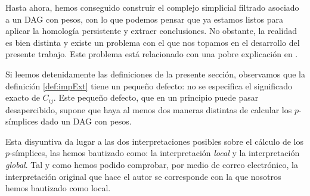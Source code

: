 \documentclass[12pt, a4paper, twoside]{book}
\numberwithin{equation}{section}
\theoremstyle{definition}
\theoremstyle{remark}
\theoremstyle{plain}
\begin{document}
	Hasta ahora, hemos conseguido construir el complejo simplicial 
	filtrado asociado a un DAG con pesos, con lo que podemos pensar que ya 
	estamos listos para aplicar la homología persistente y extraer 
	conclusiones. No obstante, la realidad es bien distinta y existe un 
	problema con el que nos topamos en el desarrollo del presente trabajo. 
	Este problema está relacionado con una pobre explicación en 
	\cite{Articulo-Watanabe}. 
	
	Si leemos detenidamente las definiciones de la presente sección, 
	observamos que la definición \ref{def:impExt} tiene un pequeño 
	defecto: no 
	se especifica el significado exacto de $C_{ij}$. Este pequeño defecto, 
	que en un principio puede pasar desapercibido, supone que haya al 
	menos dos maneras distintas de calcular los $p$-símplices dado un DAG 
	con pesos.

	Esta disyuntiva da lugar a las dos interpretaciones posibles sobre el
	cálculo de los $p$-símplices, las hemos bautizado como: la 
	interpretación \emph{local} y la interpretación \emph{global}. Tal y 
	como hemos podido comprobar, por medio de correo electrónico, la 
	interpretación original que hace el autor se corresponde con la que 
	nosotros hemos bautizado como local.
	
\end{document}
